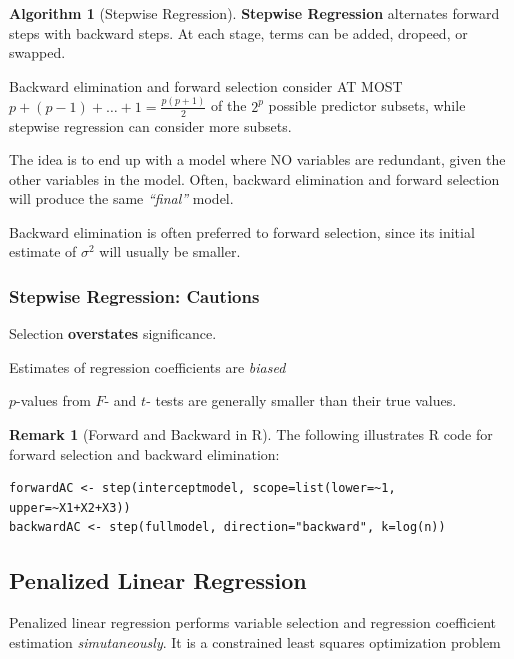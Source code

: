 \documentclass[11pt]{article}
\newenvironment{indentone}{\begin{adjustwidth}{3em}{0em}}{\end{adjustwidth}}
\theoremstyle{definition}
\newtheorem{remark}{Remark}[section]
\newtheorem{algorithm}{Algorithm}[section]
\numberwithin{equation}{section}
\begin{document}
\begin{algorithm}[Stepwise Regression]
  \textbf{Stepwise Regression} alternates forward steps with backward steps. At each stage, terms can be added, dropeed, or swapped.
\end{algorithm}

\begin{writenotes}
  Backward elimination and forward selection consider AT MOST $p + (p - 1) + \dots + 1 = \frac{p(p+1)}{2}$ of the $2^p$ possible predictor subsets, while stepwise regression can consider more subsets.

  The idea is to end up with a model where NO variables are redundant, given the other variables in the model. Often, backward elimination and forward selection will produce the same \textit{``final''} model.

  Backward elimination is often preferred to forward selection, since its initial estimate of $\sigma^2$ will usually be smaller.
\end{writenotes}

\subsubsection{Stepwise Regression: Cautions}

Selection \textbf{overstates} significance.
\begin{indentone}
  Estimates of regression coefficients are \textit{biased}

  $p$-values from $F$- and $t$- tests are generally smaller than their true values.
\end{indentone}

\begin{remark}[Forward and Backward in R]
The following illustrates R code for forward selection and backward elimination:
\begin{verbatim}
forwardAC <- step(interceptmodel, scope=list(lower=~1, upper=~X1+X2+X3))
backwardAC <- step(fullmodel, direction="backward", k=log(n))
\end{verbatim}
\end{remark}

\subsection{Penalized Linear Regression}

Penalized linear regression performs variable selection and regression coefficient estimation \textit{simutaneously}. It is a constrained least squares optimization problem
\end{document}
